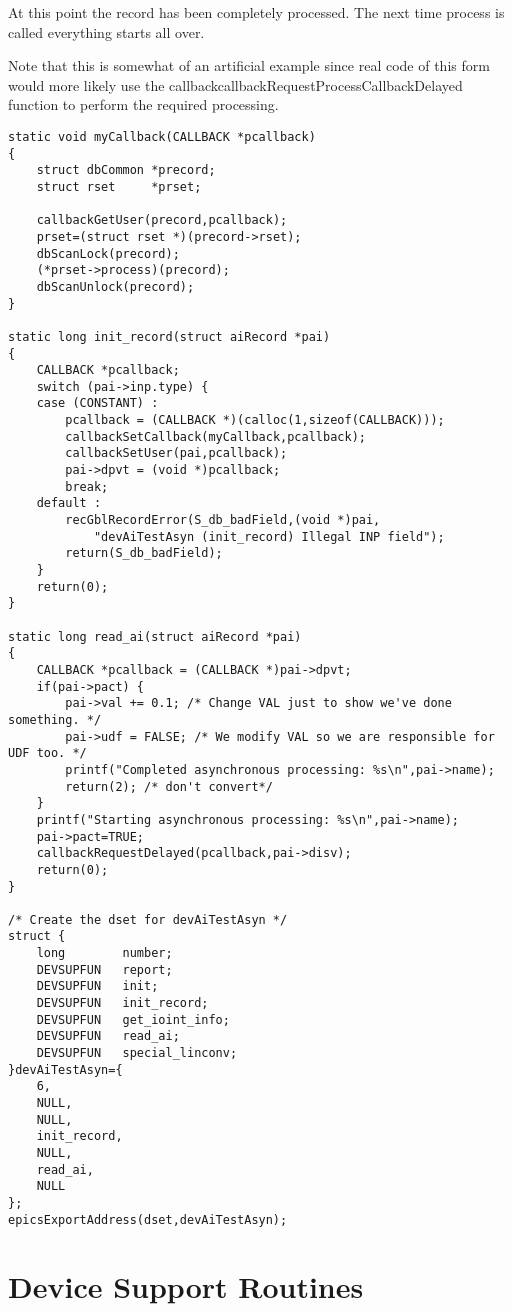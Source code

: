 At this point the record has been completely processed.
The next time process is called everything starts all over.

Note that this is somewhat of an artificial example since real code of this form would more likely use the callbackcallbackRequestProcessCallbackDelayed function to perform the required processing.

\begin{verbatim}
static void myCallback(CALLBACK *pcallback)
{
    struct dbCommon *precord;
    struct rset     *prset;

    callbackGetUser(precord,pcallback);
    prset=(struct rset *)(precord->rset);
    dbScanLock(precord);
    (*prset->process)(precord);
    dbScanUnlock(precord);
}

static long init_record(struct aiRecord *pai)
{
    CALLBACK *pcallback;
    switch (pai->inp.type) {
    case (CONSTANT) :
        pcallback = (CALLBACK *)(calloc(1,sizeof(CALLBACK)));
        callbackSetCallback(myCallback,pcallback);
        callbackSetUser(pai,pcallback);
        pai->dpvt = (void *)pcallback;
        break;
    default :
        recGblRecordError(S_db_badField,(void *)pai,
            "devAiTestAsyn (init_record) Illegal INP field");
        return(S_db_badField);
    }
    return(0);
}

static long read_ai(struct aiRecord *pai)
{
    CALLBACK *pcallback = (CALLBACK *)pai->dpvt;
    if(pai->pact) {
        pai->val += 0.1; /* Change VAL just to show we've done something. */
        pai->udf = FALSE; /* We modify VAL so we are responsible for UDF too. */
        printf("Completed asynchronous processing: %s\n",pai->name);
        return(2); /* don't convert*/
    } 
    printf("Starting asynchronous processing: %s\n",pai->name);
    pai->pact=TRUE;
    callbackRequestDelayed(pcallback,pai->disv);
    return(0);
}

/* Create the dset for devAiTestAsyn */
struct {
    long        number;
    DEVSUPFUN   report;
    DEVSUPFUN   init;
    DEVSUPFUN   init_record;
    DEVSUPFUN   get_ioint_info;
    DEVSUPFUN   read_ai;
    DEVSUPFUN   special_linconv;
}devAiTestAsyn={
    6,
    NULL,
    NULL,
    init_record,
    NULL,
    read_ai,
    NULL
};
epicsExportAddress(dset,devAiTestAsyn);
\end{verbatim}

\section{Device Support Routines}

